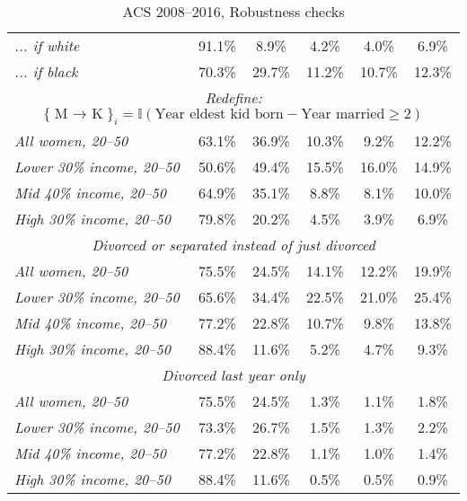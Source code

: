 \documentclass[12pt,letter]{article}
\newcommand{\I}{\mathbb{I}}
\begin{document}
\begin{table}
\begin{center}
\begin{tabular}{|l|c|c|c|c|c|}
\emph{... if white} & 91.1\% &  8.9\% &  4.2\% &  4.0\% &  6.9\% \\
\emph{... if black} & 70.3\% & 29.7\% & 11.2\% & 10.7\% & 12.3\% \\\hline\hline
\multicolumn{6}{|c|}{\emph{Redefine:} $\{\text{M $\to$ K}\}_i = \I(\text{Year eldest kid born} - \text{Year married} \geq 2)$} \\\hline\hline
\emph{All women, 20--50} &  63.1\% & 36.9\% & 10.3\% &  9.2\% & 12.2\% \\\hline
\emph{Lower 30\% income, 20--50} &  50.6\% & 49.4\% & 15.5\% & 16.0\% & 14.9\% \\\hline
\emph{Mid 40\% income, 20--50} & 64.9\% & 35.1\% &  8.8\% &  8.1\% & 10.0\% \\\hline
\emph{High 30\% income, 20--50} & 79.8\% & 20.2\% &  4.5\% &  3.9\% &  6.9\% \\\hline\hline
\multicolumn{6}{|c|}{\emph{Divorced or separated instead of just divorced}} \\\hline\hline
\emph{All women, 20--50} &  75.5\% & 24.5\% & 14.1\% & 12.2\% & 19.9\% \\\hline
\emph{Lower 30\% income, 20--50} &  65.6\% & 34.4\% & 22.5\% & 21.0\% & 25.4\% \\\hline
\emph{Mid 40\% income, 20--50} & 77.2\% & 22.8\% & 10.7\% &  9.8\% & 13.8\% \\\hline
\emph{High 30\% income, 20--50} & 88.4\% & 11.6\% &  5.2\% &  4.7\% &  9.3\% \\\hline\hline
\multicolumn{6}{|c|}{\emph{Divorced last year only}} \\\hline\hline
\emph{All women, 20--50} &  75.5\% & 24.5\% &  1.3\% &  1.1\% &  1.8\% \\\hline
\emph{Lower 30\% income, 20--50} &  73.3\% & 26.7\% &  1.5\% &  1.3\% &  2.2\% \\\hline
\emph{Mid 40\% income, 20--50} & 77.2\% & 22.8\% &  1.1\% &  1.0\% &  1.4\% \\\hline
\emph{High 30\% income, 20--50} & 88.4\% & 11.6\% &  0.5\% &  0.5\% &  0.9\% \\\hline\hline
\end{tabular}
\end{center}
\caption{ACS 2008--2016, Robustness checks\label{rcheck}}
\end{table}
\end{document}
